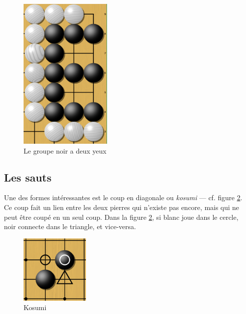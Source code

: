 \documentclass[11pt,a4paper,titlepage,french]{article}
\begin{document}
			\begin{figure}[hbt]
			\label{deuxyeux}
			\begin{center}
			\includegraphics[width=0.4\textwidth]{deuxyeux.png}
			\end{center}
			\caption{Le groupe noir a deux yeux}
			\end{figure}

		\subsection{Les sauts}

			Une des formes intéressantes est le coup en diagonale ou \emph{kosumi} --- cf. figure \ref{kosumi}. Ce coup fait un lien entre les deux pierres qui n'existe pas encore, mais qui ne peut être coupé en un seul coup. Dans la figure \ref{kosumi}, si blanc joue dans le cercle, noir connecte dans le triangle, et vice-versa.

			\begin{figure}[hbt]
			\label{kosumi}
			\begin{center}
			\includegraphics[width=0.3\textwidth]{kosumi.png}
			\end{center}
			\caption{Kosumi}
			\end{figure}
\end{document}
